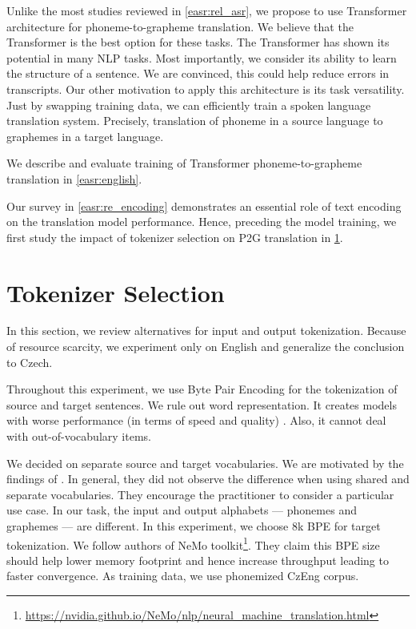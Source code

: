Unlike the most studies reviewed in \cref{easr:rel_asr}, we propose to use Transformer architecture for phoneme-to-grapheme translation. We believe that the Transformer is the best option for these tasks. The Transformer has shown its potential in many NLP tasks. Most importantly, we consider its ability to learn the structure of a sentence. We are convinced, this could help reduce errors in transcripts. Our other motivation to apply this architecture is its task versatility. Just by swapping training data, we can efficiently train a spoken language translation system. Precisely, translation of phoneme in a source language to graphemes in a target language. 

We describe and evaluate training of Transformer phoneme-to-grapheme translation in \cref{easr:english}.

Our survey in \cref{easr:re_encoding} demonstrates an essential role of text encoding on the translation model performance. Hence, preceding the model training, we first study the impact of tokenizer selection on P2G translation in \cref{easr:tokenizer}.


\section{Tokenizer Selection}
\label{easr:tokenizer}

In this section, we review alternatives for input and output tokenization. Because of resource scarcity, we experiment only on English and generalize the conclusion to Czech. 

Throughout this experiment, we use Byte Pair Encoding for the tokenization of source and target sentences. We rule out word representation. It creates models with worse performance (in terms of speed and quality) . Also, it cannot deal with out-of-vocabulary items.

We decided on separate source and target vocabularies. We are motivated by the findings of . In general, they did not observe the difference when using shared and separate vocabularies. They encourage the practitioner to consider a particular use case. In our task, the input and output alphabets --- phonemes and graphemes --- are different. In this experiment, we choose 8k BPE for target tokenization. We follow authors of NeMo toolkit\footnote{\url{https://nvidia.github.io/NeMo/nlp/neural_machine_translation.html}}. They claim this BPE size should help lower memory footprint and hence increase throughput leading to faster convergence. As training data, we use phonemized CzEng corpus. 


